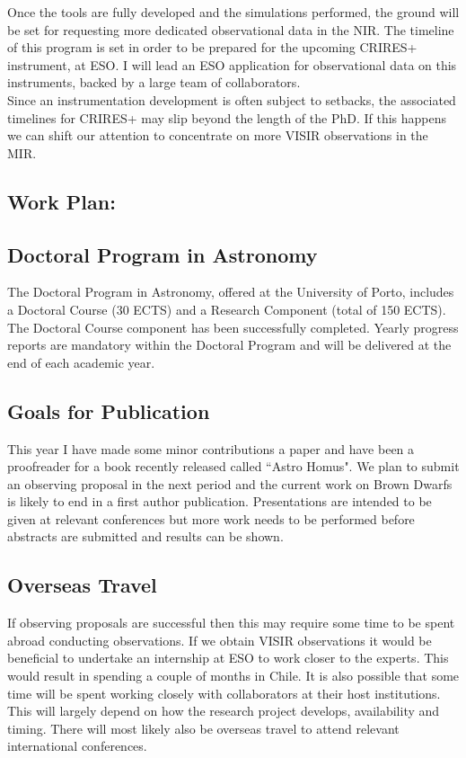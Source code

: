 \documentclass[pdftex,12pt,a4paper]{article}
\begin{document}
Once the tools are fully developed and the simulations performed, the ground will be set for requesting more dedicated observational data in the NIR. The timeline of this program is set in order to be prepared for the upcoming CRIRES+ instrument, at ESO. I will lead an ESO application for observational data on this instruments, backed by a large team of collaborators. \\

Since an instrumentation development is often subject to setbacks, the associated timelines for CRIRES+ may slip beyond the length of the PhD. If this happens we can shift our attention to concentrate on more VISIR observations in the MIR.


\subsection{Work Plan:}
\subsection*{Doctoral Program in Astronomy}
The Doctoral Program in Astronomy, offered at the University of Porto, includes a Doctoral Course (30 ECTS) and a Research Component (total of 150 ECTS). The Doctoral Course component has been successfully completed. Yearly progress reports are mandatory within the Doctoral Program and will be delivered at the end of each academic year.

\subsection*{Goals for Publication}
This year I have made some minor contributions a paper \citep{Figueria2015prep} and have been a proofreader for a book recently released called ``Astro Homus". We plan to submit an observing proposal in the next period and the current work on Brown Dwarfs is likely to  end in a first author publication. Presentations are intended to be given at relevant conferences but more work needs to be performed before abstracts are submitted and results can be shown. \\

\subsection*{Overseas Travel}
If observing proposals are successful then this may require some time to be spent abroad conducting observations. If we obtain VISIR observations it would be beneficial to undertake an internship at ESO to work closer to the experts. This would result in spending a couple of months in Chile. It is also possible that some time will be spent working closely with collaborators at their host institutions. This will largely depend on how the research project develops, availability and timing. There will most likely also be overseas travel to attend relevant international conferences.
\end{document}
